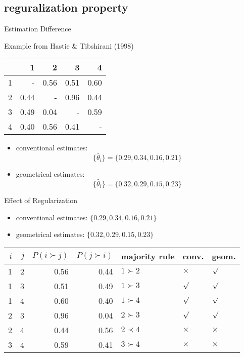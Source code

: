 \documentclass[fleqn,aspectratio=1610]{beamer}
\begin{document}
\subsection{reguralization property}
\label{sec:org7d98b76}
\begin{frame}[label={sec:org716a675}]{Estimation Difference}
\begin{exampleblock}{Example from Hastie \& Tibshirani (1998)}\label{sec:org9cf1193}
\begin{center}
\begin{tabular}{r|rrrr}
\hline
 & 1 & 2 & 3 & 4\\[0pt]
\hline
1 & - & 0.56 & 0.51 & 0.60\\[0pt]
2 & 0.44 & - & 0.96 & 0.44\\[0pt]
3 & 0.49 & 0.04 & - & 0.59\\[0pt]
4 & 0.40 & 0.56 & 0.41 & -\\[0pt]
\hline
\end{tabular}
\end{center}
\end{exampleblock}
\begin{itemize}
\item <2-> conventional estimates:
\begin{equation}
  \{\hat\theta_{i}\}=\{0.29,0.34,0.16,0.21\}
\end{equation}
\item <3-> geometrical estimates:
\begin{equation}
  \{\hat\theta_{i}\}=\{0.32,0.29,0.15,0.23\}
\end{equation}
\end{itemize}
\end{frame}
\begin{frame}[label={sec:org88074be}]{Effect of Regularization}
\begin{itemize}
\item conventional estimates: \(\{0.29,0.34,0.16,0.21\}\)
\item geometrical estimates: \(\{0.32,0.29,0.15,0.23\}\)
\end{itemize}
\begin{center}
\begin{center}
\begin{tabular}{rr|rr|l|ll}
\hline
\(i\) & \(j\) & \(P(i\succ j)\) & \(P(j\succ i)\) & majority rule & conv. & geom.\\[0pt]
\hline
1 & 2 & 0.56 & 0.44 & \(1 \succ 2\) & \(\times\) & \(\surd\)\\[0pt]
1 & 3 & 0.51 & 0.49 & \(1 \succ 3\) & \(\surd\) & \(\surd\)\\[0pt]
1 & 4 & 0.60 & 0.40 & \(1 \succ 4\) & \(\surd\) & \(\surd\)\\[0pt]
2 & 3 & 0.96 & 0.04 & \(2 \succ 3\) & \(\surd\) & \(\surd\)\\[0pt]
2 & 4 & 0.44 & 0.56 & \(2 \prec 4\) & \(\times\) & \(\times\)\\[0pt]
3 & 4 & 0.59 & 0.41 & \(3 \succ 4\) & \(\times\) & \(\times\)\\[0pt]
\hline
\end{tabular}
\end{center}
\end{center}
\end{frame}
\end{document}
